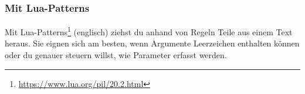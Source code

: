 \begin{Shaded}
\begin{Highlighting}[]
  \OperatorTok{=} \OperatorTok{:}\OperatorTok{(}\OperatorTok{)}
  \OperatorTok{=} \OperatorTok{[}\OperatorTok{]}

  \OperatorTok{==}  
      \OperatorTok{=} \OperatorTok{[}\OperatorTok{]}
    \OperatorTok{(}\OperatorTok{,} \OperatorTok{)}
     \OperatorTok{,} 
  \OperatorTok{==}  
      \OperatorTok{=} \OperatorTok{[}\OperatorTok{]}
      \OperatorTok{=} \OperatorTok{(}\OperatorTok{[}\OperatorTok{])}
        
         \OperatorTok{,}
                 
                 
                 
                 
         \OperatorTok{,}
     \OperatorTok{,} 
\end{Highlighting}
\end{Shaded}

\subsubsection{Mit Lua-Patterns}\label{mit-lua-patterns}

Mit Lua-Patterns\footnote{\url{https://www.lua.org/pil/20.2.html}}
(englisch) ziehst du anhand von Regeln Teile aus einem Text heraus. Sie
eignen sich am besten, wenn Argumente Leerzeichen enthalten können oder
du genauer steuern willst, wie Parameter erfasst werden.

